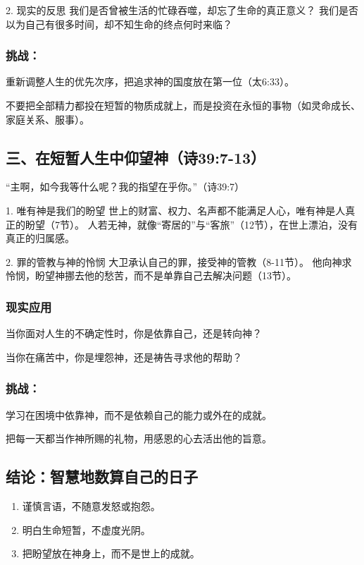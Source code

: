 \documentclass[a4paper, 12pt]{article}
\begin{document}
2. 现实的反思
我们是否曾被生活的忙碌吞噬，却忘了生命的真正意义？
我们是否以为自己有很多时间，却不知生命的终点何时来临？

\subsubsection*{挑战：}

\hspace{0.6cm}重新调整人生的优先次序，把追求神的国度放在第一位（太6:33）。

不要把全部精力都投在短暂的物质成就上，而是投资在永恒的事物（如灵命成长、家庭关系、服事）。
\subsection*{三、在短暂人生中仰望神（诗39:7-13）}
“主啊，如今我等什么呢？我的指望在乎你。”（诗39:7）

1. 唯有神是我们的盼望
世上的财富、权力、名声都不能满足人心，唯有神是人真正的盼望（7节）。
人若无神，就像“寄居的”与“客旅”（12节），在世上漂泊，没有真正的归属感。

2. 罪的管教与神的怜悯
大卫承认自己的罪，接受神的管教（8-11节）。
他向神求怜悯，盼望神挪去他的愁苦，而不是单靠自己去解决问题（13节）。
\subsubsection*{现实应用}
\hspace{0.6cm}当你面对人生的不确定性时，你是依靠自己，还是转向神？

当你在痛苦中，你是埋怨神，还是祷告寻求他的帮助？
\subsubsection*{挑战：}

\hspace{0.6cm}学习在困境中依靠神，而不是依赖自己的能力或外在的成就。

把每一天都当作神所赐的礼物，用感恩的心去活出他的旨意。
\subsection*{结论：智慧地数算自己的日子}
\begin{enumerate}
    \item 谨慎言语，不随意发怒或抱怨。

    \item 明白生命短暂，不虚度光阴。

    \item 把盼望放在神身上，而不是世上的成就。

    
\end{enumerate}
\end{document}
